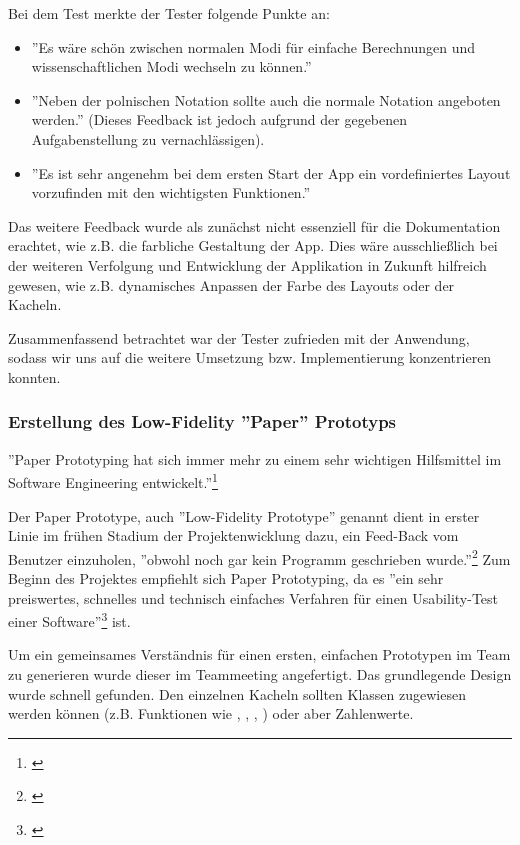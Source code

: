 Bei dem Test merkte der Tester folgende Punkte an:
\begin{itemize}
	\item ''Es wäre schön zwischen normalen Modi für einfache Berechnungen und wissenschaftlichen Modi wechseln zu können.''
	\item ''Neben der polnischen Notation sollte auch die normale Notation angeboten werden.'' (Dieses Feedback ist jedoch aufgrund der gegebenen Aufgabenstellung zu vernachlässigen).
	\item ''Es ist sehr angenehm bei dem ersten Start der App ein vordefiniertes Layout vorzufinden mit den wichtigsten Funktionen.''
\end{itemize}

Das weitere Feedback wurde als zunächst nicht essenziell für die Dokumentation erachtet, wie z.B. die farbliche Gestaltung der App. Dies wäre ausschließlich bei der weiteren Verfolgung und Entwicklung der Applikation in Zukunft hilfreich gewesen, wie z.B. dynamisches Anpassen der Farbe des Layouts oder der Kacheln. 

Zusammenfassend betrachtet war der Tester zufrieden mit der Anwendung, sodass wir uns auf die weitere Umsetzung bzw. Implementierung konzentrieren konnten. 

\subsubsection{Erstellung des Low-Fidelity ''Paper'' Prototyps}
\label{subsubsection:erstellung-low-fidelity-paper}

''Paper Prototyping hat sich immer mehr zu einem sehr wichtigen Hilfsmittel im Software Engineering entwickelt.''\footnote{\cite[][]{paperPrototypeGentgesxy2002a}}

Der Paper Prototype, auch ''Low-Fidelity Prototype'' genannt dient in erster Linie im frühen Stadium der Projektenwicklung dazu, ein Feed-Back vom Benutzer einzuholen, ''obwohl noch gar kein Programm geschrieben wurde.''\footnote{\cite[][]{paperPrototypeGentgesxy2002a}}  Zum Beginn des Projektes empfiehlt sich Paper Prototyping, da es ''ein sehr preiswertes, schnelles und technisch einfaches Verfahren für einen Usability-Test einer Software''\footnote{\cite[][]{paperPrototypeGentgesxy2002a}} ist.

Um ein gemeinsames Verständnis für einen ersten, einfachen Prototypen im Team zu generieren wurde dieser im Teammeeting angefertigt. Das grundlegende Design wurde schnell gefunden. Den einzelnen Kacheln sollten Klassen zugewiesen werden können (z.B. Funktionen wie , ,  , ) oder aber Zahlenwerte. 

